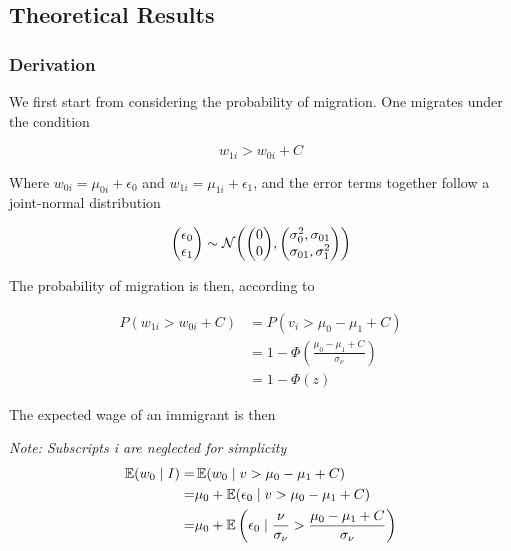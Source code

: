 \subsection{Theoretical Results}

\subsubsection{Derivation}

We first start from considering the probability of migration. 
One migrates under the condition

\begin{equation}
    w_{1i} > w_{0i} + C
\end{equation}

Where $w_{0i} = \mu_{0i} + \epsilon_0$ and $w_{1i} = \mu_{1i} + \epsilon_1$, 
and the error terms together follow a joint-normal distribution

\begin{equation}
    \label{eq:def_w}
    \mqty(\epsilon_0 \\ \epsilon_1) 
    \sim
    \mathcal{N} \qty(
        \mqty(0 \\ 0),
        \mqty(\sigma_0^2, \sigma_{01} \\
              \sigma_{01}, \sigma_1^2)
    )
\end{equation}

The probability of migration is then, according to 

\begin{align}
    P(w_{1i} > w_{0i} + C) &= P(v_i > \mu_0 - \mu_1 + C) \nonumber \\
    &=1 - \Phi(\frac{\mu_0 - \mu_1 + C}{\sigma_\nu}) \nonumber \\
    &=1 - \Phi(z) \nonumber
\end{align}

The expected wage of an immigrant is then

\newcommand{\given}{\mid}

\emph{Note: Subscripts i are neglected for simplicity}
\begin{align*}
    \E(w_{0} \given I) =& \E(w_{0} \given v > \mu_0 - \mu_1 + C)  \\
    =& \mu_0 + \E(\epsilon_0 \given  v > \mu_0 - \mu_1 + C )  \\
    =& \mu_0 + \E \left(
            \epsilon_0 \given \frac{\nu}{\sigma_\nu} > \frac{\mu_0 - \mu_1 + C}{\sigma_\nu}
            \right)
\end{align*}


